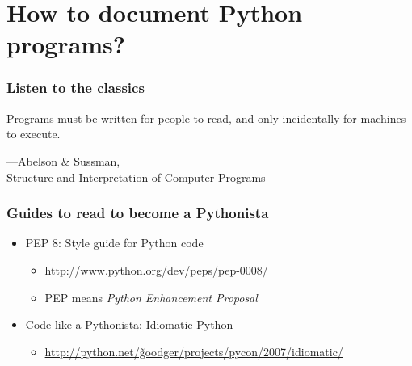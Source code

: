 \documentclass[11pt]{beamer}
\begin{document}
\section{How to document Python programs?}
\label{sec-1}
\begin{frame}[fragile]\frametitle{Listen to the classics}
\label{sec-1_1}


\hfill
\begin{block}{}
    Programs must be written for people to read, and only incidentally
    for machines to execute.
\begin{flushright}
    —Abelson \& Sussman,\\ Structure and Interpretation of Computer
    Programs
\end{flushright}
\end{block}
\hfill
\end{frame}
\begin{frame}[fragile]\frametitle{Guides to read to become a Pythonista}
\label{sec-1_2}


\begin{itemize}
\item PEP 8: Style guide for Python code

\begin{itemize}
\item \href{http://www.python.org/dev/peps/pep-0008/}{http://www.python.org/dev/peps/pep-0008/}
\item PEP means \emph{Python Enhancement Proposal}
\end{itemize}

\item Code like a Pythonista: Idiomatic Python

\begin{itemize}
\item \href{http://python.net/~goodger/projects/pycon/2007/idiomatic/}{http://python.net/\~goodger/projects/pycon/2007/idiomatic/}
\end{itemize}

\end{itemize}
\end{frame}
\end{document}
